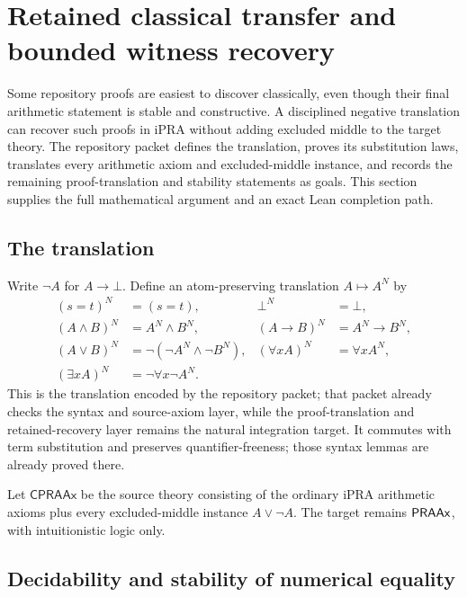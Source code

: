 \section{Retained classical transfer and bounded witness recovery}
\label{sec:retained-transfer}

Some repository proofs are easiest to discover classically, even though their final arithmetic statement is stable and constructive.  A disciplined negative translation can recover such proofs in iPRA without adding excluded middle to the target theory.  The repository packet  defines the translation, proves its substitution laws, translates every arithmetic axiom and excluded-middle instance, and records the remaining proof-translation and stability statements as goals.  This section supplies the full mathematical argument and an exact Lean completion path.

\subsection{The translation}

Write \(\neg A\) for \(A\to\bot\).  Define an atom-preserving translation \(A\mapsto A^N\) by
\begin{align*}
 (s=t)^N&=(s=t),& \bot^N&=\bot,\\
 (A\wedge B)^N&=A^N\wedge B^N,&
 (A\to B)^N&=A^N\to B^N,\\
 (A\vee B)^N&=\neg(\neg A^N\wedge\neg B^N),&
 (\forall x A)^N&=\forall x A^N,\\
 (\exists x A)^N&=\neg\forall x\neg A^N.
\end{align*}
This is the translation encoded by the repository packet; that packet already checks the syntax and source-axiom layer, while the proof-translation and retained-recovery layer remains the natural integration target.  It commutes with term substitution and preserves quantifier-freeness; those syntax lemmas are already proved there.

Let \(\mathsf{CPRAAx}\) be the source theory consisting of the ordinary iPRA arithmetic axioms plus every excluded-middle instance \(A\vee\neg A\).  The target remains \(\mathsf{PRAAx}\), with intuitionistic logic only.

\subsection{Decidability and stability of numerical equality}

